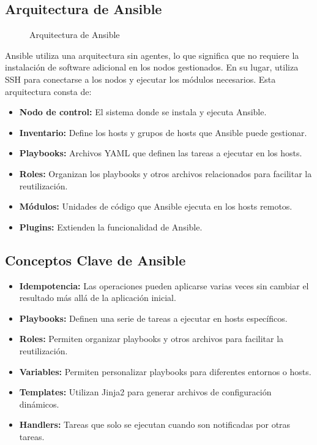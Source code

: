 \documentclass[12pt,a4paper]{report}
\begin{document}
\subsection{Arquitectura de Ansible}

\begin{figure}[H]
\centering
\caption{Arquitectura de Ansible}
\label{fig:ansible_architecture}
\end{figure}

Ansible utiliza una arquitectura sin agentes, lo que significa que no requiere la instalación de software adicional en los nodos gestionados. En su lugar, utiliza SSH para conectarse a los nodos y ejecutar los módulos necesarios. Esta arquitectura consta de:

\begin{itemize}
    \item \textbf{Nodo de control:} El sistema donde se instala y ejecuta Ansible.
    \item \textbf{Inventario:} Define los hosts y grupos de hosts que Ansible puede gestionar.
    \item \textbf{Playbooks:} Archivos YAML que definen las tareas a ejecutar en los hosts.
    \item \textbf{Roles:} Organizan los playbooks y otros archivos relacionados para facilitar la reutilización.
    \item \textbf{Módulos:} Unidades de código que Ansible ejecuta en los hosts remotos.
    \item \textbf{Plugins:} Extienden la funcionalidad de Ansible.
\end{itemize}

\subsection{Conceptos Clave de Ansible}

\begin{itemize}
    \item \textbf{Idempotencia:} Las operaciones pueden aplicarse varias veces sin cambiar el resultado más allá de la aplicación inicial.
    \item \textbf{Playbooks:} Definen una serie de tareas a ejecutar en hosts específicos.
    \item \textbf{Roles:} Permiten organizar playbooks y otros archivos para facilitar la reutilización.
    \item \textbf{Variables:} Permiten personalizar playbooks para diferentes entornos o hosts.
    \item \textbf{Templates:} Utilizan Jinja2 para generar archivos de configuración dinámicos.
    \item \textbf{Handlers:} Tareas que solo se ejecutan cuando son notificadas por otras tareas.
\end{itemize}
\end{document}
